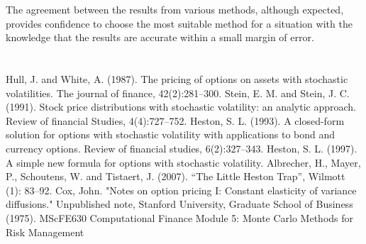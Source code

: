 \documentclass[11pt]{article}
\begin{document}
The agreement between the results from various methods, although expected, provides confidence to choose the most suitable method for a situation with the knowledge that the results are accurate within a small margin of error.

\newpage
\section*{} \label{bibsection}


\begin{thebibliography}{MMMMM} 
 Hull, J. and White, A. (1987). The pricing of options on assets
with stochastic volatilities. The journal of finance, 42(2):281--300.
 Stein, E. M. and Stein, J. C. (1991). Stock price distributions
with stochastic volatility: an analytic approach. Review of financial
Studies, 4(4):727--752.
 Heston, S. L. (1993). A closed-form solution for options with
stochastic volatility with applications to bond and currency options.
Review of financial studies, 6(2):327--343.
 Heston, S. L. (1997). A simple new formula for options with
stochastic volatility.
 Albrecher, H., Mayer, P., Schoutens, W. and Tistaert, J. (2007).
``The Little Heston Trap'', Wilmott (1): 83--92.
  Cox, John. "Notes on option pricing I: Constant elasticity of variance diffusions." Unpublished note, Stanford University, Graduate School of Business (1975).
 MScFE630 Computational Finance Module 5: Monte Carlo Methods for Risk Management

\end{thebibliography}
\end{document}
